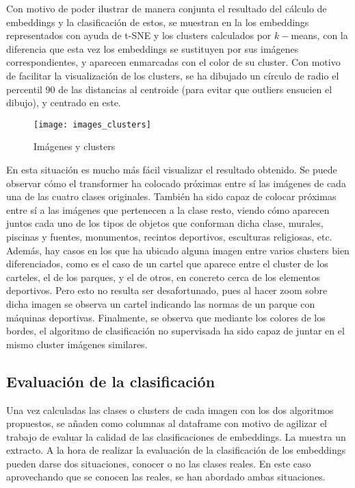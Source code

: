 				Con motivo de poder ilustrar de manera conjunta el resultado del cálculo de embeddings y la clasificación de estos, se muestran en la  los embeddings representados con ayuda de t-SNE y los clusters calculados por $k-$means, con la diferencia que esta vez los embeddings se sustituyen por sus imágenes correspondientes, y aparecen enmarcadas con el color de su cluster. Con motivo de facilitar la visualización de los clusters, se ha dibujado un círculo de radio el percentil 90 de las distancias al centroide (para evitar que outliers ensucien el dibujo), y centrado en este. \\
				
				\begin{figure}[!h]
					\centering
					\texttt{[image: images\_clusters]}
					\caption{Imágenes y clusters}
					\label{fig:embeddings_visuales}
				\end{figure} 
				
				En esta situación es mucho más fácil visualizar el resultado obtenido. Se puede observar cómo el transformer ha colocado próximas entre sí las imágenes de cada una de las cuatro clases originales. También ha sido capaz de colocar próximas entre sí a las imágenes que pertenecen a la clase resto, viendo cómo aparecen juntos cada uno de los tipos de objetos que conforman dicha clase, murales, piscinas y fuentes, monumentos, recintos deportivos, esculturas religiosas, etc. Además, hay casos en los que ha ubicado alguna imagen entre varios clusters bien diferenciados, como es el caso de un cartel que aparece entre el cluster de los carteles, el de los parques, y el de otros, en concreto cerca de los elementos deportivos. Pero esto no resulta ser desafortunado, pues al hacer zoom sobre dicha imagen se observa un cartel indicando las normas de un parque con máquinas deportivas. Finalmente, se observa que mediante los colores de los bordes, el algoritmo de clasificación no supervisada ha sido capaz de juntar en el mismo cluster imágenes similares. 
				
			\subsection{Evaluación de la clasificación}
			
				Una vez calculadas las clases o clusters de cada imagen con los dos algoritmos propuestos, se añaden como columnas al dataframe con motivo de agilizar el trabajo de evaluar la calidad de las clasificaciones de embeddings. La  muestra un extracto. A la hora de realizar la evaluación de la clasificación de los embeddings pueden darse dos situaciones, conocer o no las clases reales. En este caso aprovechando que se conocen las reales, se han abordado ambas situaciones.
			
